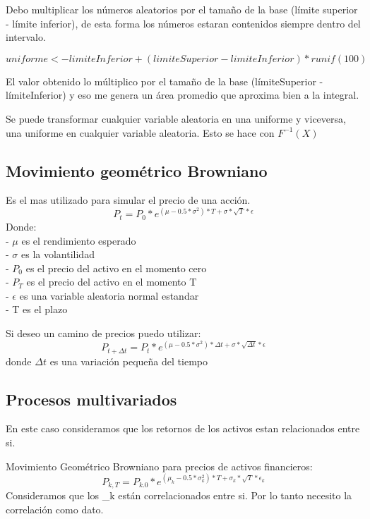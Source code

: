 \documentclass[
]{article}
\begin{document}
Debo multiplicar los números aleatorios por el tamaño de la base (límite
superior - límite inferior), de esta forma los números estaran
contenidos siempre dentro del intervalo.

\begin{equation*}
  uniforme <- limiteInferior + (limiteSuperior - limiteInferior) * runif(100)
\end{equation*}

El valor obtenido lo múltiplico por el tamaño de la base (límiteSuperior
- límiteInferior) y eso me genera un área promedio que aproxima bien a
la integral.

Se puede transformar cualquier variable aleatoria en una uniforme y
viceversa, una uniforme en cualquier variable aleatoria. Esto se hace
con \(F^{-1}(X)\)

\hypertarget{movimiento-geomuxe9trico-browniano}{%
\subsection{Movimiento geométrico
Browniano}\label{movimiento-geomuxe9trico-browniano}}

Es el mas utilizado para simular el precio de una acción.
\begin{equation*}
  P_t = P_0 * e^{(\mu - 0.5 * \sigma^2) * T + \sigma * \sqrt{T}*\epsilon}
\end{equation*} Donde:\\
- \(\mu\) es el rendimiento esperado\\
- \(\sigma\) es la volantilidad\\
- \(P_0\) es el precio del activo en el momento cero\\
- \(P_T\) es el precio del activo en el momento T\\
- \(\epsilon\) es una variable aleatoria normal estandar\\
- T es el plazo

Si deseo un camino de precios puedo utilizar: \begin{equation*}
  P_{t+\Delta t} = P_t * e^{(\mu - 0.5 * \sigma^2) * \Delta t + \sigma * \sqrt{\Delta t}*\epsilon}
\end{equation*} donde \(\Delta t\) es una variación pequeña del tiempo

\hypertarget{procesos-multivariados}{%
\subsection{Procesos multivariados}\label{procesos-multivariados}}

En este caso consideramos que los retornos de los activos estan
relacionados entre si.

Movimiento Geométrico Browniano para precios de activos financieros:
\begin{equation*}
  P_{k,T} = P_{k.0} * e^{(\mu_k - 0.5 * \sigma_k^2) * T + \sigma_k * \sqrt{T}*\epsilon_k}
\end{equation*} Consideramos que los \epsilon\_k están correlacionados
entre si. Por lo tanto necesito la correlación como dato.
\end{document}
